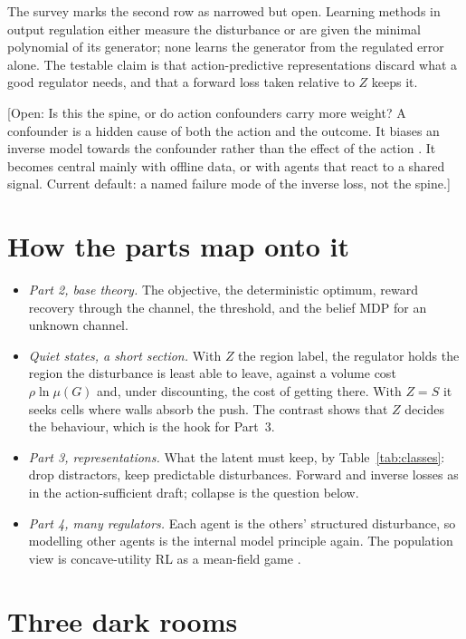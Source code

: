 \documentclass[10pt]{article}
\newcommand{\open}[1]{\textcolor{red!70!black}{[Open: #1]}}
\begin{document}
\noindent
The survey marks the second row as narrowed but open. Learning methods in output regulation either measure the disturbance or are given the minimal polynomial of its generator; none learns the generator from the regulated error alone. The testable claim is that action-predictive representations discard what a good regulator needs, and that a forward loss taken relative to $Z$ keeps it.

\open{Is this the spine, or do action confounders carry more weight? A confounder is a hidden cause of both the action and the outcome. It biases an inverse model towards the confounder rather than the effect of the action \citep{Nikulin-latent25,Lee-latent26}. It becomes central mainly with offline data, or with agents that react to a shared signal. Current default: a named failure mode of the inverse loss, not the spine.}

\section{How the parts map onto it}

\begin{itemize}
\item \emph{Part 2, base theory.} The objective, the deterministic optimum, reward recovery through the channel, the threshold, and the belief MDP for an unknown channel.
\item \emph{Quiet states, a short section.} With $Z$ the region label, the regulator holds the region the disturbance is least able to leave, against a volume cost $\rho \ln \mu(G)$ and, under discounting, the cost of getting there. With $Z = S$ it seeks cells where walls absorb the push. The contrast shows that $Z$ decides the behaviour, which is the hook for Part~3.
\item \emph{Part 3, representations.} What the latent must keep, by Table~\ref{tab:classes}: drop distractors, keep predictable disturbances. Forward and inverse losses as in the action-sufficient draft; collapse is the question below.
\item \emph{Part 4, many regulators.} Each agent is the others' structured disturbance, so modelling other agents is the internal model principle again. The population view is concave-utility RL as a mean-field game \citep{Geist-concave22}.
\end{itemize}

\section{Three dark rooms}
\end{document}
